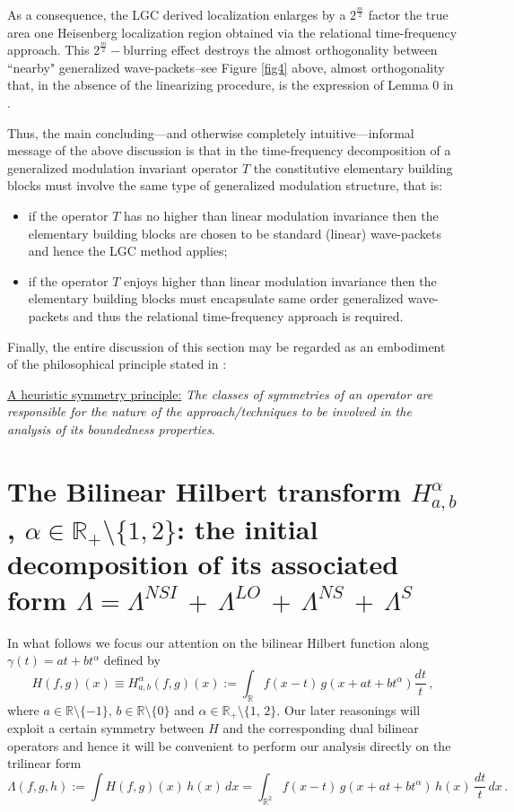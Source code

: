 \documentclass[a4paper,reqno]{amsart}
\numberwithin{equation}{section}
\theoremstyle{definition}
\newcommand{\R}{\mathbb{R}}
\def\a{\alpha}
\def\g{\gamma}
\def\L{\Lambda}
\begin{document}
As a consequence, the LGC derived localization enlarges by a $2^{\frac{m}{2}}$ factor the true area one Heisenberg localization region obtained via the relational time-frequency approach. This $2^{\frac{m}{2}}-$blurring effect destroys the almost orthogonality between ``nearby" generalized wave-packets--see Figure \ref{fig4} above, almost orthogonality that, in the absence of the linearizing procedure, is the expression of Lemma 0 in \cite{Lie09}.

Thus, the main concluding---and otherwise completely intuitive---informal message of the above discussion is that in the time-frequency decomposition of a generalized modulation invariant operator $T$ the constitutive elementary building blocks must involve the same type of generalized modulation structure, that is:
\begin{itemize}
 \item if the operator $T$ has no higher than linear modulation invariance then the elementary building blocks are chosen to be standard (linear) wave-packets and hence the LGC method applies;

\item if the operator $T$ enjoys higher than linear modulation invariance then the elementary building blocks must encapsulate same order generalized  wave-packets and thus the relational time-frequency approach is required.
\end{itemize}
\medskip
Finally, the entire discussion of this section may be regarded as an embodiment of the philosophical principle stated in \cite{Lie20}:
\medskip

\noindent\underline{\textsf{A heuristic symmetry principle:}} \emph{The classes of symmetries of an operator are responsible for the nature of the approach/techniques to be involved in the analysis of its boundedness properties}.

\section{The Bilinear Hilbert transform $H_{a,b}^{\a}$, $\a\in \R_{+}\setminus\{1,2\}$: the initial decomposition of its associated form $\L=\L^{NSI}\,+\,\L^{LO}\,+\,\L^{NS}\,+\,\L^{S}$}\label{BilHilb}

In what follows we focus our attention on the bilinear Hilbert function along $\g(t)=at+bt^\a$ defined by
\begin{equation}\label{maintwo}
	H(f,g)(x)\equiv H_{a,b}^{\a}(f,g)(x):= \int_\R f(x-t)\,g(x+at+bt^\a)\frac{dt}{t}\,,
\end{equation}
where $a\in\R\setminus\{-1\}$, $b\in\R\setminus\{0\}$ and $\a\in\R_+\setminus\{1,\,2\}$. Our later reasonings will exploit a certain symmetry between $H$ and the corresponding dual bilinear operators and hence it will be convenient to perform our analysis directly on the trilinear form
\begin{equation}\label{trilin}
	\L(f,g,h):=\int H(f,g)(x)\,h(x)\,dx= \int_{\R^2} f(x-t)\,g(x+at+bt^\a)\,h(x)\,\frac{dt}{t}\,dx\,.\quad
\end{equation}
\end{document}
